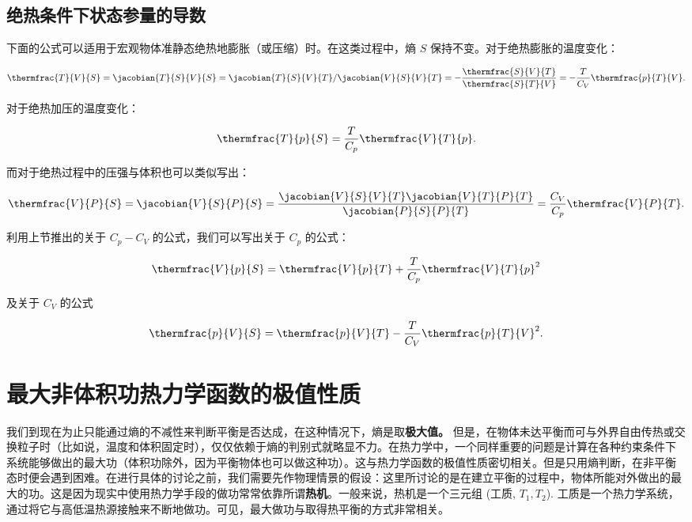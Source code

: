 \subsection{绝热条件下状态参量的导数}
下面的公式可以适用于宏观物体准静态绝热地膨胀（或压缩）时。在这类过程中，熵 $S$ 保持不变。对于绝热膨胀的温度变化：
\begin{linenomath}\begin{equation}
\thermfrac{T}{V}{S} = \jacobian{T}{S}{V}{S} = \jacobian{T}{S}{V}{T} / \jacobian{V}{S}{V}{T} = -\frac{\thermfrac{S}{V}{T}}{\thermfrac{S}{T}{V}} = -\frac{T}{C_V}\thermfrac{p}{T}{V}.
\end{equation}\end{linenomath}
对于绝热加压的温度变化：
\begin{linenomath}\begin{equation}
\thermfrac{T}{p}{S} = \frac{T}{C_p} \thermfrac{V}{T}{p}.
\end{equation}\end{linenomath}
而对于绝热过程中的压强与体积也可以类似写出：
\begin{linenomath}\begin{equation}
\thermfrac{V}{P}{S} = \jacobian{V}{S}{P}{S} = \frac{\jacobian{V}{S}{V}{T}\jacobian{V}{T}{P}{T}}{\jacobian{P}{S}{P}{T}} = \frac{C_V}{C_p} \thermfrac{V}{P}{T}.
\end{equation}\end{linenomath}
利用上节推出的关于 $C_p-C_V$ 的公式，我们可以写出关于 $C_p$ 的公式：
\begin{linenomath}\begin{equation}
\thermfrac{V}{p}{S} = \thermfrac{V}{p}{T} + \frac{T}{C_p}\thermfrac{V}{T}{p}^2
\end{equation}\end{linenomath} 及关于 $C_V$ 的公式 \begin{linenomath}\begin{equation}
\thermfrac{p}{V}{S} = \thermfrac{p}{V}{T} - \frac{T}{C_V}\thermfrac{p}{T}{V}^2.
\end{equation}\end{linenomath}
\section{最大非体积功\quad 热力学函数的极值性质}
我们到现在为止只能通过熵的不减性来判断平衡是否达成，在这种情况下，熵是取\textbf{极大值。} 但是，在物体未达平衡而可与外界自由传热或交换粒子时（比如说，温度和体积固定时），仅仅依赖于熵的判别式就略显不力。在热力学中，一个同样重要的问题是计算在各种约束条件下系统能够做出的最大功（体积功除外，因为平衡物体也可以做这种功）。这与热力学函数的极值性质密切相关。但是只用熵判断，在非平衡态时便会遇到困难。在进行具体的讨论之前，我们需要先作物理情景的假设：这里所讨论的是在建立平衡的过程中，物体所能对外做出的最大的功。这是因为现实中使用热力学手段的做功常常依靠所谓\textbf{热机}。一般来说，热机是一个三元组 (工质, $T_1, T_2$). 工质是一个热力学系统，通过将它与高低温热源接触来不断地做功。可见，最大做功与取得热平衡的方式非常相关。

